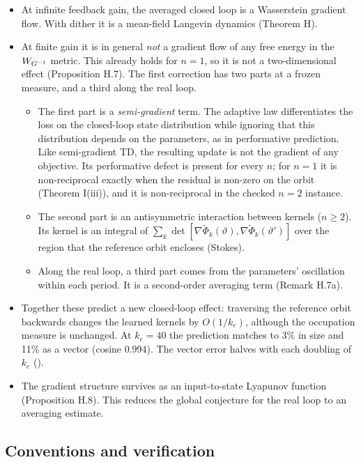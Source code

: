 \begin{itemize}
  \item At infinite feedback gain, the averaged closed loop is a Wasserstein gradient flow. With dither it is a
    mean-field Langevin dynamics (Theorem H).
  \item At finite gain it is in general \emph{not} a gradient flow of any free energy in the $W_{G^{-1}}$ metric. This
    already holds for $n = 1$, so it is not a two-dimensional effect (Proposition H.7). The first correction has two
    parts at a frozen measure, and a third along the real loop.
    \begin{itemize}
      \item The first part is a \emph{semi-gradient} term. The adaptive law differentiates the loss on the
        closed-loop state distribution while ignoring that this distribution depends on the parameters, as in
        performative prediction. Like semi-gradient TD, the resulting update is not the gradient of any objective.
        Its performative defect is present for every $n$; for $n = 1$ it is non-reciprocal exactly when the residual
        is non-zero on the orbit (Theorem I(iii)), and it is non-reciprocal in the checked $n = 2$ instance.
      \item The second part is an antisymmetric interaction between kernels ($n \ge 2$). Its kernel is an integral
        of $\sum_k \det[\nabla\tilde\Phi_k(\vartheta), \nabla\tilde\Phi_k(\vartheta')]$ over the region that the
        reference orbit encloses (Stokes).
      \item Along the real loop, a third part comes from the parameters' oscillation within each period. It is a
        second-order averaging term (Remark H.7a).
    \end{itemize}
  \item Together these predict a new closed-loop effect: traversing the reference orbit backwards changes the learned
    kernels by $O(1/k_e)$, although the occupation measure is unchanged. At $k_e = 40$ the prediction matches to 3\%
    in size and 11\% as a vector (cosine 0.994). The vector error halves with each doubling of $k_e$
    ().
  \item The gradient structure survives as an input-to-state Lyapunov function (Proposition H.8). This reduces the
    global conjecture for the real loop to an averaging estimate.
\end{itemize}

\subsection{Conventions and verification}\label{sec:front:conventions}

